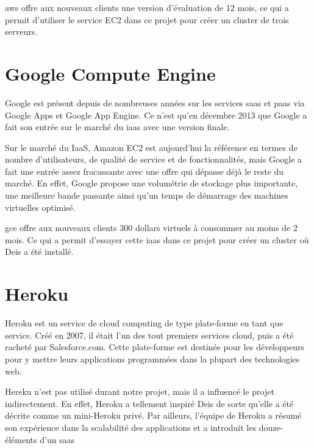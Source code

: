 \acrshort{aws} offre aux nouveaux clients une version d'évaluation de 12 mois, ce qui a permit d'utiliser le service EC2 dans ce projet pour créer un cluster de trois serveurs.

\section*{Google Compute Engine}

Google est présent depuis de nombreuses années sur les services \acrshort{saas} et \acrshort{paas} via Google Apps et Google App Engine. Ce n'est qu'en décembre 2013 que Google a fait son entrée sur le marché du \acrshort{iaas} avec une version finale.

Sur le marché du IaaS, Amazon EC2 est aujourd'hui la référence en termes de nombre d'utilisateurs, de qualité de service et de fonctionnalités, mais Google a fait une entrée assez fracassante avec une offre qui dépasse déjà le reste du marché. En effet, Google propose une volumétrie de stockage plus importante, une meilleure bande passante ainsi qu'un temps de démarrage des machines virtuelles optimisé.

\acrshort{gce} offre aux nouveaux clients 300 dollars virtuels à consommer au moins de 2 mois. Ce qui a permit d'essayer cette \acrshort{iaas} dans ce projet pour créer un cluster où Deis a été installé.

\section*{Heroku}

Heroku est un service de cloud computing de type plate-forme en tant que service. Créé en 2007, il était l'un des tout premiers services cloud, puis a été racheté par Salesforce.com. Cette plate-forme est destinée pour les développeurs pour y mettre leurs applications programmées dans la plupart des technologies web.

Hereku n'est pas utilisé durant notre projet, mais il a influencé le projet indirectement. En effet, Heroku a tellement inspiré Deis de sorte qu'elle a été décrite comme un mini-Heroku privé. Par ailleurs, l'équipe de Heroku a résumé son expérience dans la scalabilité des applications et a introduit les douze-éléments d'un \acrshort{saas}

